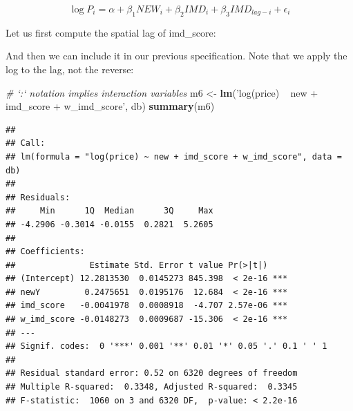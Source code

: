 \documentclass[]{book}
\newenvironment{Shaded}{\begin{snugshade}}{\end{snugshade}}
\newcommand{\KeywordTok}[1]{\textcolor[rgb]{0.13,0.29,0.53}{\textbf{#1}}}
\newcommand{\StringTok}[1]{\textcolor[rgb]{0.31,0.60,0.02}{#1}}
\newcommand{\CommentTok}[1]{\textcolor[rgb]{0.56,0.35,0.01}{\textit{#1}}}
\newcommand{\OperatorTok}[1]{\textcolor[rgb]{0.81,0.36,0.00}{\textbf{#1}}}
\newcommand{\NormalTok}[1]{#1}
\begin{document}
\[
\log{P_i} = \alpha + \beta_{1} NEW_i + \beta_{2} IMD_i + \beta_{3} IMD_{lag-i} + \epsilon_i
\]

Let us first compute the spatial lag of imd\_score:

\begin{Shaded}
\end{Shaded}

And then we can include it in our previous specification. Note that we
apply the log to the lag, not the reverse:

\begin{Shaded}
\begin{Highlighting}[]
\CommentTok{# `:` notation implies interaction variables}
\NormalTok{m6 <-}\StringTok{ }\KeywordTok{lm}\NormalTok{(}\StringTok{'log(price) ~ new + imd_score + w_imd_score'}\NormalTok{, db)}
\KeywordTok{summary}\NormalTok{(m6)}
\end{Highlighting}
\end{Shaded}

\begin{verbatim}
## 
## Call:
## lm(formula = "log(price) ~ new + imd_score + w_imd_score", data = db)
## 
## Residuals:
##     Min      1Q  Median      3Q     Max 
## -4.2906 -0.3014 -0.0155  0.2821  5.2605 
## 
## Coefficients:
##               Estimate Std. Error t value Pr(>|t|)    
## (Intercept) 12.2813530  0.0145273 845.398  < 2e-16 ***
## newY         0.2475651  0.0195176  12.684  < 2e-16 ***
## imd_score   -0.0041978  0.0008918  -4.707 2.57e-06 ***
## w_imd_score -0.0148273  0.0009687 -15.306  < 2e-16 ***
## ---
## Signif. codes:  0 '***' 0.001 '**' 0.01 '*' 0.05 '.' 0.1 ' ' 1
## 
## Residual standard error: 0.52 on 6320 degrees of freedom
## Multiple R-squared:  0.3348, Adjusted R-squared:  0.3345 
## F-statistic:  1060 on 3 and 6320 DF,  p-value: < 2.2e-16
\end{verbatim}
\end{document}
